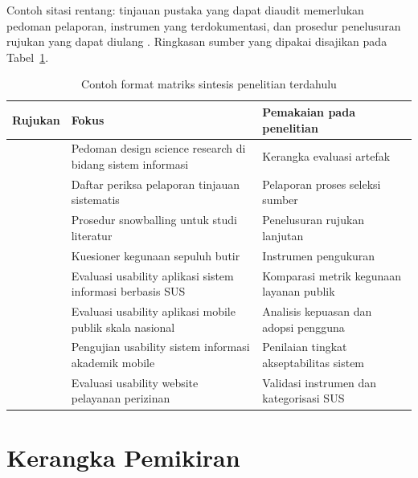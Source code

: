 Contoh sitasi rentang: tinjauan pustaka yang dapat diaudit memerlukan
pedoman pelaporan, instrumen yang terdokumentasi, dan prosedur
penelusuran rujukan yang dapat diulang
\cite{page2021prisma,brooke1996sus,wohlin2014snowballing}.
Ringkasan sumber yang dipakai disajikan pada Tabel~\ref{tab:matriks-sintesis}.

\begin{table}[htbp]
  \centering
  \caption{Contoh format matriks sintesis penelitian terdahulu}
  \label{tab:matriks-sintesis}
  \begin{tabularx}{\textwidth}{@{}l>{\raggedright\arraybackslash}X>{\raggedright\arraybackslash}X@{}}
    \toprule
    Rujukan & Fokus & Pemakaian pada penelitian \\
    \midrule
    \cite{hevner2004design}      & Pedoman design science research di bidang sistem informasi & Kerangka evaluasi artefak \\
    \cite{page2021prisma}        & Daftar periksa pelaporan tinjauan sistematis & Pelaporan proses seleksi sumber \\
    \cite{wohlin2014snowballing} & Prosedur snowballing untuk studi literatur & Penelusuran rujukan lanjutan \\
    \cite{brooke1996sus}         & Kuesioner kegunaan sepuluh butir & Instrumen pengukuran \\
    \cite{refriansyah2025evaluasi} & Evaluasi usability aplikasi sistem informasi berbasis SUS & Komparasi metrik kegunaan layanan publik \\
    \cite{lupitadyayu2023evaluasi} & Evaluasi usability aplikasi mobile publik skala nasional & Analisis kepuasan dan adopsi pengguna \\
    \cite{eldo2026evaluasi}      & Pengujian usability sistem informasi akademik mobile & Penilaian tingkat akseptabilitas sistem \\
    \cite{zainurrohmah2022evaluasi} & Evaluasi usability website pelayanan perizinan & Validasi instrumen dan kategorisasi SUS \\
    \bottomrule
  \end{tabularx}
\end{table}

\section{Kerangka Pemikiran}
\label{sec:kerangka-pemikiran}


